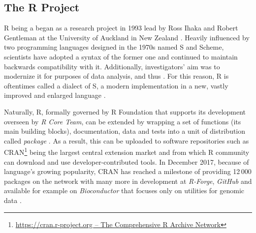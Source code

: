 \subsection{The R Project}
\label{rlang}
R being a  began as a research project in 1993 lead by Ross Ihaka and Robert Gentleman at the University of Auckland in New Zealand \parencites{RCoreTeam2017R:Computing}{RCoreTeam2017RDefinition}{RProject2017WhatR, DavidSmith2016OverHistory}.
Heavily influenced by two programming languages designed in the 1970s named S and Scheme, scientists have adopted a syntax of the former one and continued to maintain backwards compatibility with it. 
Additionally, investigators' aim was to modernize it for purposes of data analysis, and thus  \parencites[299]{Ihaka1996R:Graphics}{RossIhaka2009TheFuture}.
For this reason, R is oftentimes called a dialect of S, a modern implementation in a new, vastly improved and enlarged language \parencite{RCoreTeam2017AnR}.

Naturally, R, formally governed by R Foundation that supports its development overseen by \emph{R Core Team}, can be extended by wrapping a set of functions (its main building blocks), documentation, data and tests into a unit of distribution called \emph{package} \parencite{DavidSmith2016OverHistory}.
As a result, this can be uploaded to software repositories such as \ac{CRAN}\footnote{\href{https://cran.r-project.org/}{https://cran.r-project.org -- The Comprehensive R Archive Network}} being the largest central extension market and from which R community can download and use developer-contributed tools.
In December 2017, because of language's growing popularity, \ac{CRAN} has reached a milestone of providing 12\,000 packages on the network with many more in development at \emph{R-Forge}, \emph{GitHub} and available for example on \emph{Bioconductor} that focuses only on utilities for genomic data \parencites{DavidSmith2017CRANNeed.}{German2013TheEcosystem}{Sylvia2014}{HenrikBengtsson2017Subject:CRAN}. 

